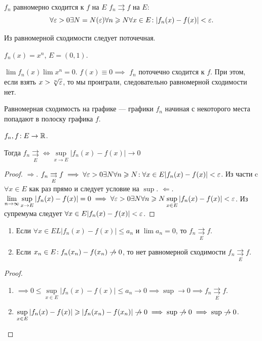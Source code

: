 \begin{definition}
    $f_n$ равномерно сходится к  $f$ на  $E$  $f_n \rightrightarrows f$ на $E$:
     \[
    \forall \varepsilon > 0 \exists N=N(\varepsilon) \forall n \geqslant N \forall x \in E\!: |f_n(x) - f(x)| < \varepsilon
    .\] 
\end{definition}
\begin{remark}
    Из равномерной сходимости следует поточечная.
\end{remark}
\begin{example}
    $f_n(x) = x^n$,  $E = (0, 1)$.

     $\lim f_n(x) \lim x^n = 0$. $f(x) \equiv 0 \implies $  $f_n$ поточечно сходится к  $f$. При этом, если взять  $x > \sqrt[n]{\varepsilon}$, то мы проиграли, следовательно равномерной сходимости нет.
\end{example}
\begin{remark}
    Равномерная сходимость на графике --- графики $f_n$ начиная с некоторого места попадают в полоску графика  $f$.
\end{remark}
\begin{theorem}
    $f_n, f\!:E \to \mathbb{R}$. 

    Тогда  $f_n \underset{E}{\rightrightarrows} \iff \sup\limits_{x \to E} |f_n(x) - f(x)| \to 0$
\end{theorem}
\begin{proof}
    $\Rightarrow$. $f_n \underset{E}{\rightrightarrows} f \implies \forall \varepsilon > 0 \exists N \forall n \geqslant N\!: \forall x \in E |f_n(x) - f(x)| < \varepsilon$. Из части c $\forall x \in E$ как раз прямо и следует условие на  $\sup$.
    $\Leftarrow$. $\lim\limits_{n \to \infty} \sup\limits_{x \to E} |f_n(x) - f(x)| = 0 \implies \forall \varepsilon > 0 \exists N \forall n \geqslant N \sup\limits_{x \in E}|f_n(x) - f(x)| < \varepsilon$. Из супремума следует $\forall x \in E |f_n(x) - f(x)| < \varepsilon$.
\end{proof}
\begin{consequence}
\begin{enumerate}
    \item Если $\forall x \in E\!L |f_n(x) - f(x)| \le a_n$ и $\lim a_n = 0$, то $f_n \underset{E}{\rightrightarrows} f$.
    \item Если  $x_n \in E\!: f_n(x_n) - f(x_n) \centernot \to 0$, то нет равномерной сходимости  $f_n \underset{E}{\rightrightarrows} f$.
\end{enumerate}
\end{consequence}
\begin{proof}
    \begin{enumerate}
        \item $\implies 0 \le \sup\limits_{x \in E} |f_n(x) - f(x)| \le a_n \to 0 \implies \sup \to 0 \implies f_n \underset{E}{\rightrightarrows}f$.
        \item $\sup\limits_{x \in E} |f_n(x) - f(x)| \ge |f_n(x_n)  - f(x_n)| \centernot \to 0 \implies \sup \centernot \to 0 \implies \sup \centernot \to 0$.
    \end{enumerate}
\end{proof}
